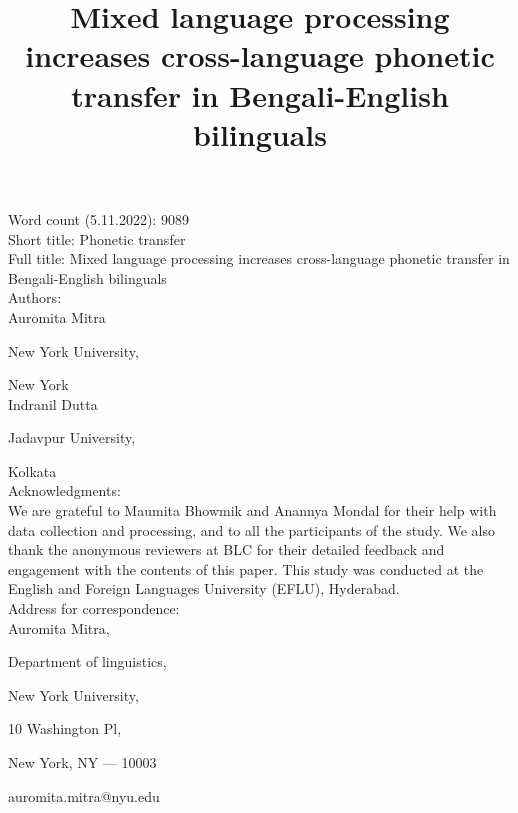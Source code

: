 \documentclass[12 pt]{article}
\title{Mixed language processing increases cross-language phonetic transfer in Bengali-English bilinguals}
\newlength\mystoreparindent
\newenvironment{myparindent}[1]{%
	\setlength{\mystoreparindent}{\the\parindent}
	\setlength{\parindent}{#1}
}{%
	\setlength{\parindent}{\mystoreparindent}
}
\begin{document}




\begin{singlespace}

\begin{myparindent}{0pt}
	
Word count (5.11.2022): 9089 \\
	
	
Short title: Phonetic transfer\\

Full title: Mixed language processing increases cross-language phonetic transfer in Bengali-English bilinguals\\

Authors:\\

Auromita Mitra

New York University,

New York\\

Indranil Dutta

Jadavpur University,

Kolkata\\

Acknowledgments:\\
We are grateful to Maumita Bhowmik and Anannya Mondal for their help with data collection and processing, and to all the participants of the study. We also thank the anonymous reviewers at BLC for their detailed feedback and engagement with the contents of this paper. This study was conducted at the English and Foreign Languages University (EFLU), Hyderabad. \\
 

Address for correspondence:\\
Auromita Mitra,

Department of linguistics,

New York University,

10 Washington Pl,

New York, NY --- 10003

auromita.mitra@nyu.edu

\end{myparindent}

\end{singlespace}
\end{document}
